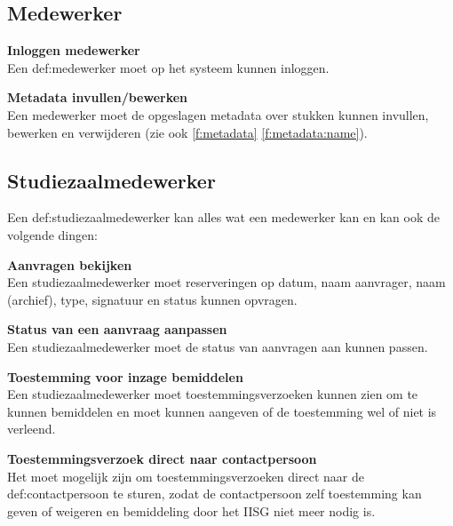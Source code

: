 \documentclass[a4paper,titlepage]{report}
\makeatletter
\def\nameddisplayedlabel#1#2{
  \label{#1}
  \begingroup
   \def\@currentlabel{#2}%
   \label{#1:name}\endgroup
   \textbf{#2}\hfill\\
}
\def\namedref#1{\ref{#1} \ref{#1:name}}
\makeatother
\begin{document}
    \subsection{Medewerker}
      \begin{enumerate}[label={[F:\arabic*]},resume]
        \item\nameddisplayedlabel{f:inloggen}{Inloggen medewerker}
          Een \gls{def:medewerker} moet op het systeem kunnen inloggen.
        \item\nameddisplayedlabel{f:metadata-invullen}{Metadata invullen/bewerken}
          Een medewerker moet de opgeslagen metadata over stukken kunnen invullen, bewerken
          en verwijderen (zie ook \namedref{f:metadata}).
      \end{enumerate}

    \subsection{Studiezaalmedewerker}
      Een \gls{def:studiezaalmedewerker} kan alles wat een medewerker kan en kan ook de
      volgende dingen:
      \begin{enumerate}[label={[F:\arabic*]},resume]
        \item\nameddisplayedlabel{f:reserveringen-bekijken}{Aanvragen bekijken}
          Een studiezaalmedewerker moet reserveringen op datum, naam aanvrager,
          naam (archief), type, signatuur en status kunnen opvragen.
        \item\nameddisplayedlabel{f:status-reservering}{Status van een aanvraag
          aanpassen}
          Een studiezaalmedewerker moet de status van aanvragen aan kunnen passen.
        \item\nameddisplayedlabel{f:permissie-bemiddel}
          {Toestemming voor inzage bemiddelen}
          Een studiezaalmedewerker moet toestemmingsverzoeken kunnen zien om te kunnen
          bemiddelen en moet kunnen aangeven of de toestemming wel of niet
          is verleend.
          \begin{enumerate}[label={[F:\arabic{enumi}\alph*]}]
            \item\nameddisplayedlabel{f:permissie_direct}{Toestemmingsverzoek
            direct naar contactpersoon}
              Het moet mogelijk zijn om toestemmingsverzoeken direct naar de
              \gls{def:contactpersoon} te sturen, zodat de contactpersoon zelf toestemming
              kan geven of weigeren en bemiddeling door het IISG niet meer nodig
              is.
          \end{enumerate}
      \end{enumerate}
\end{document}
